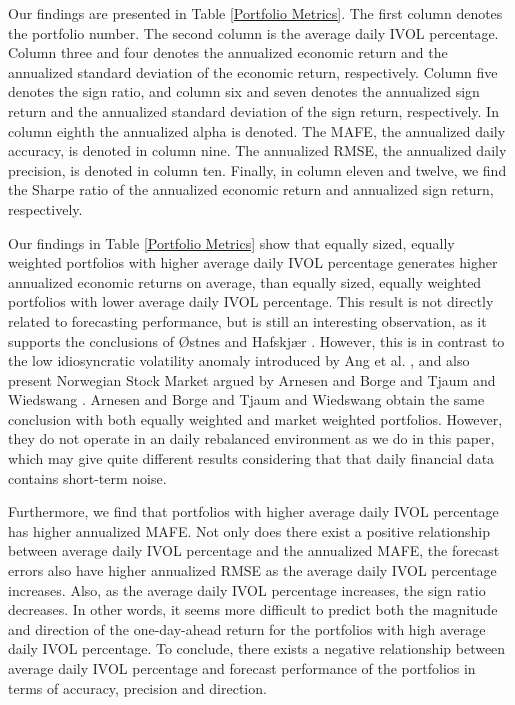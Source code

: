 Our findings are presented in Table \ref{Portfolio Metrics}. The first column denotes the portfolio number. The second column is the average daily IVOL percentage. Column three and four denotes the annualized economic return and the annualized standard deviation of the economic return, respectively. Column five denotes the sign ratio, and column six and seven denotes the annualized sign return and the annualized standard deviation of the sign return, respectively. In column eighth the annualized alpha is denoted. The MAFE, the annualized daily accuracy, is denoted in column nine. The annualized RMSE, the annualized daily precision, is denoted in column ten. Finally, in column eleven and twelve, we find the Sharpe ratio of the annualized economic return and annualized sign return, respectively. 

Our findings in Table \ref{Portfolio Metrics} show that equally sized, equally weighted portfolios with higher average daily IVOL percentage generates higher annualized economic returns on average, than equally sized, equally weighted portfolios with lower average daily IVOL percentage. This result is not directly related to forecasting performance, but is still an interesting observation, as it supports the conclusions of Østnes and Hafskjær \cite{ostnes}. However, this is in contrast to the low idiosyncratic volatility anomaly introduced by Ang et al. \cite{angetal06}, and also present Norwegian Stock Market argued by Arnesen and Borge \cite{arnborge} and Tjaum and Wiedswang \cite{thaumwiedswang}. Arnesen and Borge \cite{arnborge} and Tjaum and Wiedswang \cite{thaumwiedswang} obtain the same conclusion with both equally weighted and market weighted portfolios. However, they do not operate in an daily rebalanced environment as we do in this paper, which may give quite different results considering that that daily financial data contains short-term noise. 

Furthermore, we find that portfolios with higher average daily IVOL percentage has higher annualized MAFE. Not only does there exist a positive relationship between average daily IVOL percentage and the annualized MAFE, the forecast errors also have higher annualized RMSE as the average daily IVOL percentage increases. Also, as the average daily IVOL percentage increases, the sign ratio decreases. In other words, it seems more difficult to predict both the magnitude and direction of the one-day-ahead return for the portfolios with high average daily IVOL percentage. To conclude, there exists a negative relationship between average daily IVOL percentage and forecast performance of the portfolios in terms of accuracy, precision and direction. 

